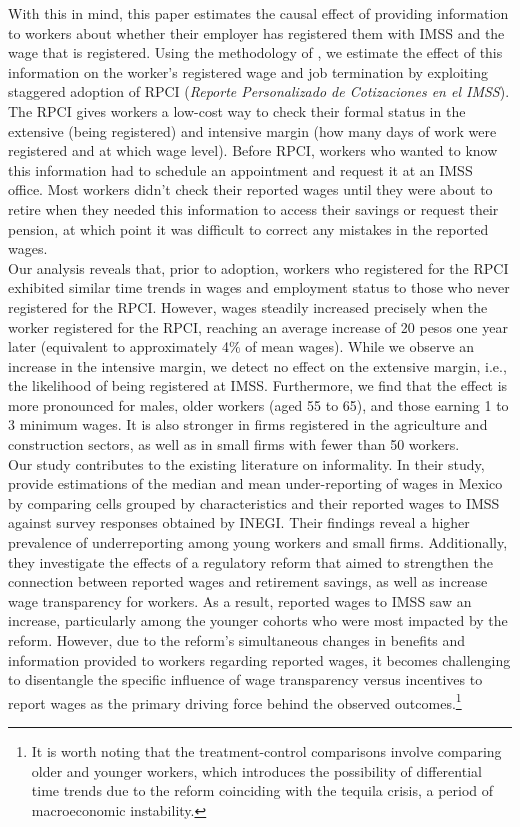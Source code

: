 \documentclass[10pt, oneside]{book}
\begin{document}
With this in mind, this paper estimates the causal effect of providing information to workers about whether their employer has registered them with IMSS and the wage that is registered. Using the methodology of \cite{deChaisemartin2022}, we estimate the effect of this information on the worker's registered wage and job termination by exploiting staggered adoption of RPCI (\textit{Reporte Personalizado de Cotizaciones en el IMSS}). The RPCI gives workers a low-cost way to check their formal status in the extensive (being registered) and intensive margin (how many days of work were registered and at which wage level). Before RPCI, workers who wanted to know this information had to schedule an appointment and request it at an IMSS office. Most workers didn't check their reported wages until they were about to retire when they needed this information to access their savings or request their pension, at which point it was difficult to correct any mistakes in the reported wages. \\

Our analysis reveals that, prior to adoption, workers who registered for the RPCI exhibited similar time trends in wages and employment status to those who never registered for the RPCI. However, wages steadily increased precisely when the worker registered for the RPCI, reaching an average increase of 20 pesos one year later (equivalent to approximately 4\% of mean wages). While we observe an increase in the intensive margin, we detect no effect on the extensive margin, i.e., the likelihood of being registered at IMSS. Furthermore, we find that the effect is more pronounced for males, older workers (aged 55 to 65), and those earning 1 to 3 minimum wages. It is also stronger in firms registered in the agriculture and construction sectors, as well as in small firms with fewer than 50 workers. \\

Our study contributes to the existing literature on informality. In their study, \cite{kumler2020enlisting} provide estimations of the median and mean under-reporting of wages in Mexico by comparing cells grouped by characteristics and their reported wages to IMSS against survey responses obtained by INEGI. Their findings reveal a higher prevalence of underreporting among young workers and small firms. Additionally, they investigate the effects of a regulatory reform that aimed to strengthen the connection between reported wages and retirement savings, as well as increase wage transparency for workers. As a result, reported wages to IMSS saw an increase, particularly among the younger cohorts who were most impacted by the reform. However, due to the reform's simultaneous changes in benefits and information provided to workers regarding reported wages, it becomes challenging to disentangle the specific influence of wage transparency versus incentives to report wages as the primary driving force behind the observed outcomes.\footnote{It is worth noting that the treatment-control comparisons involve comparing older and younger workers, which introduces the possibility of differential time trends due to the reform coinciding with the tequila crisis, a period of macroeconomic instability.} \\
\end{document}

